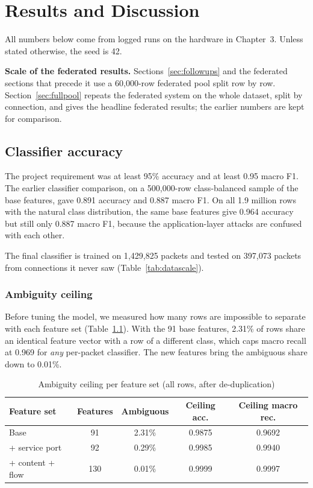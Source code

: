 \chapter{Results and Discussion}\label{chap:results}
All numbers below come from logged runs on the hardware in Chapter~3. Unless stated otherwise, the seed is 42.

\textbf{Scale of the federated results.} Sections~\ref{sec:followups} and the federated sections that precede it use a 60{,}000-row federated pool split row by row. Section~\ref{sec:fullpool} repeats the federated system on the whole dataset, split by connection, and gives the headline federated results; the earlier numbers are kept for comparison.

\section{Classifier accuracy}
The project requirement was at least 95\% accuracy and at least 0.95 macro F1. The earlier classifier comparison, on a 500{,}000-row class-balanced sample of the base features, gave 0.891 accuracy and 0.887 macro F1. On all 1.9 million rows with the natural class distribution, the same base features give 0.964 accuracy but still only 0.887 macro F1, because the application-layer attacks are confused with each other.

The final classifier is trained on 1{,}429{,}825 packets and tested on 397{,}073 packets from connections it never saw (Table~\ref{tab:datascale}).

\subsection{Ambiguity ceiling}
Before tuning the model, we measured how many rows are impossible to separate with each feature set (Table~\ref{tab:ceiling}). With the 91 base features, 2.31\% of rows share an identical feature vector with a row of a different class, which caps macro recall at 0.969 for \emph{any} per-packet classifier. The new features bring the ambiguous share down to 0.01\%.
\begin{table}[H]
\centering
\renewcommand{\arraystretch}{1.2}
\begin{tabular}{|l|c|c|c|c|}
\hline
\textbf{Feature set} & \textbf{Features} & \textbf{Ambiguous} & \textbf{Ceiling acc.} & \textbf{Ceiling macro rec.} \\ \hline
Base & 91 & 2.31\% & 0.9875 & 0.9692 \\ \hline
+ service port & 92 & 0.29\% & 0.9985 & 0.9940 \\ \hline
+ content + flow & 130 & 0.01\% & 0.9999 & 0.9997 \\ \hline
\end{tabular}
\caption{Ambiguity ceiling per feature set (all rows, after de-duplication)}
\label{tab:ceiling}
\end{table}

